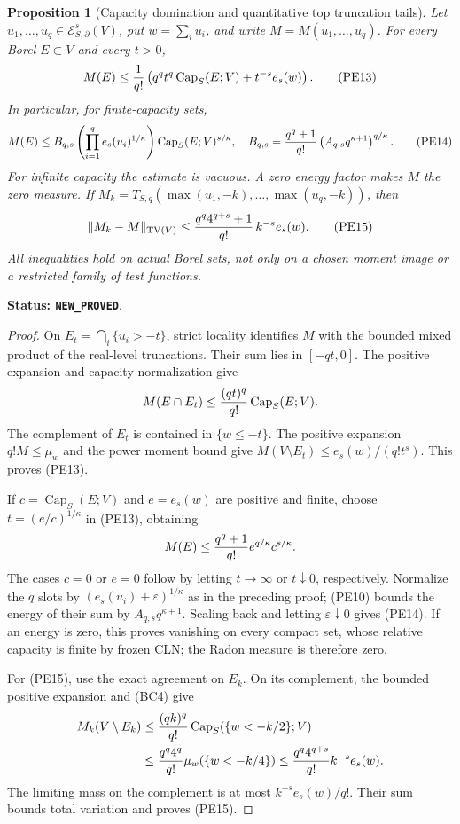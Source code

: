 \documentclass[11pt,a4paper]{article}
\numberwithin{equation}{section}
\newtheorem{proposition}[theorem]{Proposition}
\theoremstyle{definition}
\theoremstyle{remark}
\begin{document}
\begin{proposition}[Capacity domination and quantitative top truncation tails]
\label{prop:r11-power-capacity-domination}
Let $u_1,\ldots,u_q\in\mathcal E^s_{S,\partial}(V)$, put
$w=\sum_i u_i$, and write $M=M(u_1,\ldots,u_q)$.
For every Borel $E\subset V$ and every $t>0$,
\[
 M(E)\leq{1\over q!}
       \left(q^qt^q\operatorname{Cap}_S(E;V)+t^{-s}e_s(w)\right).
 \tag{PE13}
\]
In particular, for finite-capacity sets,
\[
 M(E)\leq B_{q,s}
       \left(\prod_{i=1}^q e_s(u_i)^{1/\kappa}\right)
                    \operatorname{Cap}_S(E;V)^{s/\kappa},
 \quad
 B_{q,s}={q^q+1\over q!}
                  \left(A_{q,s}q^{\kappa+1}\right)^{q/\kappa}.
 \tag{PE14}
\]
For infinite capacity the estimate is vacuous. A zero energy
factor makes $M$ the zero measure.
If $M_k=T_{S,q}(\max(u_1,-k),\ldots,\max(u_q,-k))$, then
\[
 \|M_k-M\|_{\mathrm{TV}(V)}
       \leq {q^q4^{q+s}+1\over q!}\,k^{-s}e_s(w).
 \tag{PE15}
\]
All inequalities hold on actual Borel sets, not only on a chosen
moment image or a restricted family of test functions.
\end{proposition}

\noindent\textbf{Status: \texttt{NEW\_PROVED}}.

\begin{proof}
On $E_t=\bigcap_i\{u_i>-t\}$, strict locality identifies $M$
with the bounded mixed product of the real-level truncations.
Their sum lies in $[-qt,0]$. The positive expansion and capacity
normalization give
\[
                         M(E\cap E_t)
                        \leq{(qt)^q\over q!}\operatorname{Cap}_S(E;V).
\]
The complement of $E_t$ is contained in $\{w\leq-t\}$.
The positive expansion $q!M\leq\mu_w$ and the power moment
bound give $M(V\setminus E_t)\leq e_s(w)/(q!t^s)$.
This proves (PE13).

If $c=\operatorname{Cap}_S(E;V)$ and $e=e_s(w)$ are positive
and finite, choose $t=(e/c)^{1/\kappa}$ in (PE13), obtaining
\[
                   M(E)\leq{q^q+1\over q!}
                                   e^{q/\kappa}c^{s/\kappa}.
\]
The cases $c=0$ or $e=0$ follow by letting $t\to\infty$ or
$t\downarrow0$, respectively. Normalize the $q$ slots by
$(e_s(u_i)+\varepsilon)^{1/\kappa}$ as in the preceding proof;
(PE10) bounds the energy of their sum by
$A_{q,s}q^{\kappa+1}$. Scaling back and letting
$\varepsilon\downarrow0$ gives (PE14). If an energy is zero,
this proves vanishing on every compact set, whose relative
capacity is finite by frozen CLN; the Radon measure is therefore
zero.

For (PE15), use the exact agreement on $E_k$. On its complement,
the bounded positive expansion and (BC4) give
\[
 \begin{split}
 M_k(V\setminus E_k)
  &\leq{(qk)^q\over q!}\operatorname{Cap}_S(\{w<-k/2\};V)\\
  &\leq{q^q4^q\over q!}\mu_w(\{w<-k/4\})
   \leq{q^q4^{q+s}\over q!}k^{-s}e_s(w).
 \end{split}
\]
The limiting mass on the complement is at most
$k^{-s}e_s(w)/q!$. Their sum bounds total variation and proves
(PE15).
\end{proof}
\end{document}
